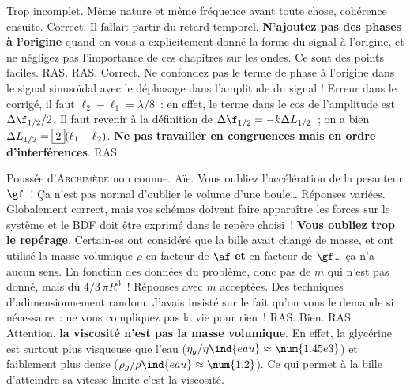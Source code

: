 \documentclass[a4paper, 12pt, final, garamond]{book}
\begin{document}
\setcounter{section}{0}
\begin{enumerate}
	Trop incomplet. Même nature et même fréquence avant toute chose, cohérence
	ensuite.
	Correct.
	Il fallait partir du retard temporel. \textbf{N'ajoutez pas des phases à
		l'origine} quand on vous a explicitement donné la forme du signal à l'origine,
	et ne négligez pas l'importance de ces chapitres sur les ondes. Ce sont des
	points faciles.
	RAS.
	RAS.
	Correct.
	Ne confondez pas le terme de phase à l'origine dans le signal sinusoïdal avec
	le déphasage dans l'amplitude du signal ! Erreur dans le corrigé, il faut
	$\ell_2- \ell_1 = \lambda/8$~: en effet, le terme dans le cos de l'amplitude
	est $\Delta\f_{1/2}/2$. Il faut revenir à la définition de $\Delta\f_{1/2} =
		-k\Delta{L_{1/2}}$~; on a bien $\Delta{L_{1/2}} = \fbox{2}(\ell_1 - \ell_2)$.
	\bigbreak
	\textbf{Ne pas travailler en congruences mais en ordre d'interférences}.
	RAS.
\end{enumerate}

\begin{enumerate}
	Poussée d'\textsc{Archimède} non connue. Aïe. Vous oubliez l'accélération de
	la pesanteur $\gf$~! Ça n'est pas normal d'oublier le volume d'une boule…
	Réponses variées.
	Globalement correct, mais vos schémas doivent faire apparaître les forces sur
	le système et le BDF doit être exprimé dans le repère choisi~! \textbf{Vous
		oubliez trop le repérage}.
	Certain-es ont considéré que la bille avait changé de masse, et ont utilisé la
	masse volumique $\rho$ en facteur de $\af$ \textbf{et} en facteur de $\gf$… ça
	n'a aucun sens.
	En fonction des données du problème, donc pas de $m$ qui n'est pas donné, mais
	du $4/3\,\pi R^{3}$~! Réponses avec $m$ acceptées.
	\smallbreak
	Des techniques d'adimensionnement random. J'avais insisté sur le fait qu'on vous
	le demande si nécessaire~: ne vous compliquez pas la vie pour rien~!
	RAS.
	Bien.
	RAS.
	Attention, \textbf{la viscosité n'est pas la masse volumique}. En effet, la
	glycérine est surtout plus visqueuse que l'eau ($\eta_g/\eta\ind{eau} \approx
		\num{1.45e3}$) et faiblement plus dense ($\rho_g/\rho\ind{eau} \approx
		\num{1.2}$). Ce qui permet à la bille d'atteindre sa vitesse limite c'est la
	viscosité.
\end{enumerate}
\end{document}

